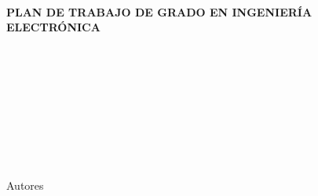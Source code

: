 \newpage
{}%
\pagestyle{plain}

\noindent \begin{center}
\textbf{\large ~}
\par\end{center}{\large \par}



\begin{center}
\textbf{\Large PLAN DE TRABAJO DE GRADO  EN  INGENIERÍA  ELECTRÓNICA }
\par\end{center}

\noindent \begin{center}
\textbf{\large ~}
\par\end{center}{\large \par}

\noindent \begin{center}
\textbf{\large ~}
\par\end{center}{\large \par}

\noindent \begin{center}
\textbf{\large ~}
\par\end{center}{\large \par}

\noindent \begin{center}%
\textbf{{\emph{\LARGE \inserttitulo }}}
\par\end{center}

\noindent \begin{center}
\textbf{\large ~}
\par\end{center}{\large \par}

\noindent \begin{center}
\textbf{\large ~}
\par\end{center}{\large \par}


\begin{singlespace} %
\noindent \begin{center} %
\LARGE Autores \\

\Large \textsc{\insertautoruno} \\
\Large \textsc{\insertautordos} \\
\textbf{\large ~}
\par\end{center}{\large \par}
\end{singlespace}

